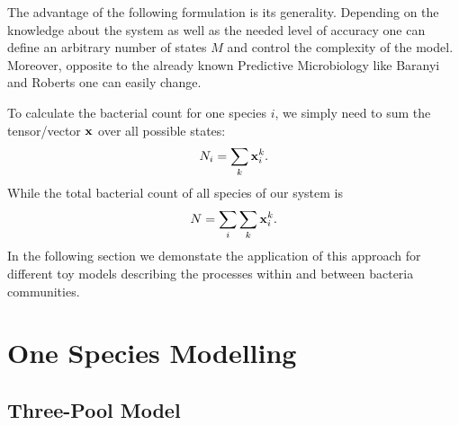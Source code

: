 \documentclass[10pt,A4paper]{article}
\begin{document}
The advantage of the following formulation is its generality. 
Depending on the knowledge about the system as well as the needed level of accuracy one can define an arbitrary number of states $M$ and control the complexity of the model.
Moreover, opposite to the already known Predictive Microbiology like Baranyi and Roberts one can easily change.

To calculate the bacterial count for one species $i$, we simply need to sum the tensor/vector $\mathbf{x}$ over all possible states:
\begin{equation}
    N_i = \sum_k \mathbf{x}_i^k.
\end{equation}
While the total bacterial count of all species of our system is
\begin{equation}
    N = \sum_i \sum_k \mathbf{x}_i^k.
\end{equation}
In the following section we demonstate the application of this approach for different toy models describing the processes within and between bacteria communities.

\newpage

\section{One Species Modelling}
\subsection{Three-Pool Model}
\end{document}
